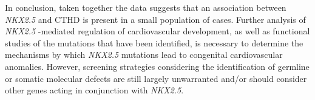 \begin{refsection}
In conclusion, taken together the data suggests that an association between \textit{NKX2.5} and CTHD is present in a small population of cases. Further analysis of \textit{NKX2.5} -mediated regulation of cardiovascular development, as well as functional studies of the mutations that have been identiﬁed, is necessary to determine the mechanisms by which \textit{NKX2.5} mutations lead to congenital cardiovascular anomalies. However, screening strategies considering the identification of germline or somatic molecular defects are still largely unwarranted and/or should consider other genes acting in conjunction with \textit{NKX2.5}.


\clearpage
\printbibliography[heading=subbibintoc]
\end{refsection}